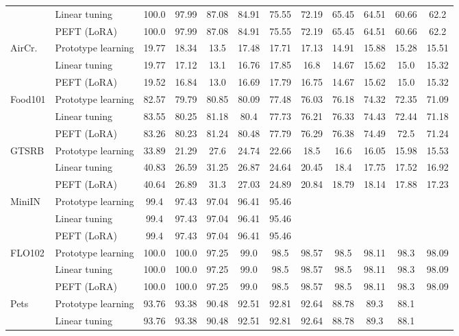 \begin{tabular}{l l cccccccccc}
 & Linear tuning & 100.0 & 97.99 & 87.08 & 84.91 & 75.55 & 72.19 & 65.45 & 64.51 & 60.66 & 62.2 \\
 & PEFT (LoRA) & 100.0 & 97.99 & 87.08 & 84.91 & 75.55 & 72.19 & 65.45 & 64.51 & 60.66 & 62.2 \\
\midrule
\multirow{3}{*}{AirCr.} & Prototype learning & 19.77 & 18.34 & 13.5 & 17.48 & 17.71 & 17.13 & 14.91 & 15.88 & 15.28 & 15.51 \\
 & Linear tuning & 19.77 & 17.12 & 13.1 & 16.76 & 17.85 & 16.8 & 14.67 & 15.62 & 15.0 & 15.32 \\
 & PEFT (LoRA) & 19.52 & 16.84 & 13.0 & 16.69 & 17.79 & 16.75 & 14.67 & 15.62 & 15.0 & 15.32 \\
\midrule
\multirow{3}{*}{Food101} & Prototype learning & 82.57 & 79.79 & 80.85 & 80.09 & 77.48 & 76.03 & 76.18 & 74.32 & 72.35 & 71.09 \\
 & Linear tuning & 83.55 & 80.25 & 81.18 & 80.4 & 77.73 & 76.21 & 76.33 & 74.43 & 72.44 & 71.18 \\
 & PEFT (LoRA) & 83.26 & 80.23 & 81.24 & 80.48 & 77.79 & 76.29 & 76.38 & 74.49 & 72.5 & 71.24 \\
\midrule
\multirow{3}{*}{GTSRB} & Prototype learning & 33.89 & 21.29 & 27.6 & 24.74 & 22.66 & 18.5 & 16.6 & 16.05 & 15.98 & 15.53 \\
 & Linear tuning & 40.83 & 26.59 & 31.25 & 26.87 & 24.64 & 20.45 & 18.4 & 17.75 & 17.52 & 16.92 \\
 & PEFT (LoRA) & 40.64 & 26.89 & 31.3 & 27.03 & 24.89 & 20.84 & 18.79 & 18.14 & 17.88 & 17.23 \\
\midrule
\multirow{3}{*}{MiniIN} & Prototype learning & 99.4 & 97.43 & 97.04 & 96.41 & 95.46 \\
 & Linear tuning & 99.4 & 97.43 & 97.04 & 96.41 & 95.46 \\
 & PEFT (LoRA) & 99.4 & 97.43 & 97.04 & 96.41 & 95.46 \\
\midrule
\multirow{3}{*}{FLO102} & Prototype learning & 100.0 & 100.0 & 97.25 & 99.0 & 98.5 & 98.57 & 98.5 & 98.11 & 98.3 & 98.09 \\
 & Linear tuning & 100.0 & 100.0 & 97.25 & 99.0 & 98.5 & 98.57 & 98.5 & 98.11 & 98.3 & 98.09 \\
 & PEFT (LoRA) & 100.0 & 100.0 & 97.25 & 99.0 & 98.5 & 98.57 & 98.5 & 98.11 & 98.3 & 98.09 \\
\midrule
\multirow{3}{*}{Pets} & Prototype learning & 93.76 & 93.38 & 90.48 & 92.51 & 92.81 & 92.64 & 88.78 & 89.3 & 88.1 \\
 & Linear tuning & 93.76 & 93.38 & 90.48 & 92.51 & 92.81 & 92.64 & 88.78 & 89.3 & 88.1 \\

\end{tabular}
